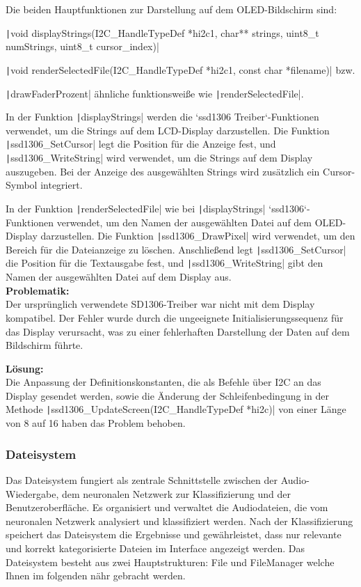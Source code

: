 Die beiden Hauptfunktionen zur Darstellung auf dem OLED-Bildschirm sind:

 \texttt|void  displayStrings(I2C_HandleTypeDef *hi2c1, char** strings, uint8_t numStrings, uint8_t cursor_index)|
 
 \texttt|void renderSelectedFile(I2C_HandleTypeDef *hi2c1, const char *filename)| bzw. 
 
 \texttt|drawFaderProzent| ähnliche funktionsweiße wie  \texttt|renderSelectedFile|. 


In der Funktion \texttt|displayStrings| werden die `ssd1306 Treiber`-Funktionen verwendet, um die Strings auf dem LCD-Display darzustellen. Die Funktion \texttt|ssd1306_SetCursor| legt die Position für die Anzeige fest, und \texttt|ssd1306_WriteString| wird verwendet, um die Strings auf dem Display auszugeben. Bei der Anzeige des ausgewählten Strings wird zusätzlich ein Cursor-Symbol integriert.

In der Funktion \texttt|renderSelectedFile| wie bei \texttt|displayStrings| `ssd1306`-Funktionen verwendet, um den Namen der ausgewählten Datei auf dem OLED-Display darzustellen. Die Funktion \texttt|ssd1306_DrawPixel| wird verwendet, um den Bereich für die Dateianzeige zu löschen. Anschließend legt \texttt|ssd1306_SetCursor| die Position für die Textausgabe fest, und \texttt|ssd1306_WriteString| gibt den Namen der ausgewählten Datei auf dem Display aus. \\

\textbf{Problematik:} \\

Der ursprünglich verwendete SD1306-Treiber war nicht mit dem Display kompatibel. Der Fehler wurde durch die ungeeignete Initialisierungssequenz für das Display verursacht, was zu einer fehlerhaften Darstellung der Daten auf dem Bildschirm führte.

\textbf{Lösung:} \\

Die Anpassung der Definitionskonstanten, die als Befehle über I2C an das Display gesendet werden, sowie die Änderung der Schleifenbedingung in der Methode \texttt|ssd1306_UpdateScreen(I2C_HandleTypeDef *hi2c)| von einer Länge von 8 auf 16 haben das Problem behoben.
\newpage


\subsubsection{Dateisystem} 
\vspace{1em}
\hypertarget{Dateisystem}{}
Das Dateisystem fungiert als zentrale Schnittstelle zwischen der Audio-Wiedergabe, dem neuronalen Netzwerk zur Klassifizierung und der Benutzeroberfläche. Es organisiert und verwaltet die Audiodateien, die vom neuronalen Netzwerk analysiert und klassifiziert werden. Nach der Klassifizierung speichert das Dateisystem die Ergebnisse und gewährleistet, dass nur relevante und korrekt kategorisierte Dateien im Interface angezeigt werden. Das Dateisystem besteht aus zwei Hauptstrukturen: File und FileManager welche Ihnen im folgenden nähr gebracht werden.

